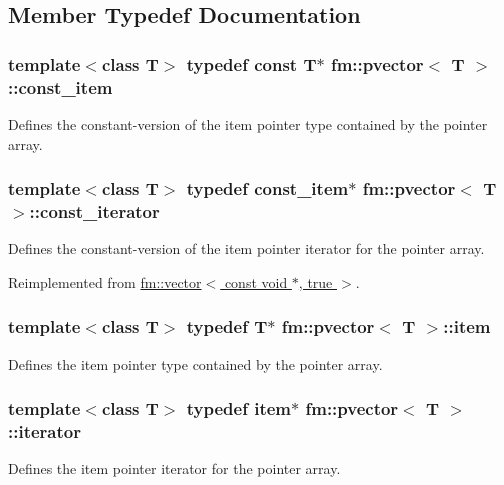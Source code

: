 \subsection{Member Typedef Documentation}
\hypertarget{classfm_1_1pvector_a6b343b4ab437d545714ff971a512bd68}{
\subsubsection[{const\_\-item}]{\setlength{\rightskip}{0pt plus 5cm}template$<$class T$>$ typedef const T$\ast$ {\bf fm::pvector}$<$ T $>$::{\bf const\_\-item}}}
\label{classfm_1_1pvector_a6b343b4ab437d545714ff971a512bd68}
Defines the constant-\/version of the item pointer type contained by the pointer array. \hypertarget{classfm_1_1pvector_a3b3854f2e635665ad6a0d59bf841099a}{
\subsubsection[{const\_\-iterator}]{\setlength{\rightskip}{0pt plus 5cm}template$<$class T$>$ typedef {\bf const\_\-item}$\ast$ {\bf fm::pvector}$<$ T $>$::{\bf const\_\-iterator}}}
\label{classfm_1_1pvector_a3b3854f2e635665ad6a0d59bf841099a}
Defines the constant-\/version of the item pointer iterator for the pointer array. 

Reimplemented from \hyperlink{classfm_1_1vector_aa012e8933574a62a4cc52e186a917722}{fm::vector$<$ const void $\ast$, true $>$}.

\hypertarget{classfm_1_1pvector_af6ced3802a18342adc0b26355d1b75bf}{
\subsubsection[{item}]{\setlength{\rightskip}{0pt plus 5cm}template$<$class T$>$ typedef T$\ast$ {\bf fm::pvector}$<$ T $>$::{\bf item}}}
\label{classfm_1_1pvector_af6ced3802a18342adc0b26355d1b75bf}
Defines the item pointer type contained by the pointer array. \hypertarget{classfm_1_1pvector_aee306ff70b8a124899a67cbe5b2fabb3}{
\subsubsection[{iterator}]{\setlength{\rightskip}{0pt plus 5cm}template$<$class T$>$ typedef {\bf item}$\ast$ {\bf fm::pvector}$<$ T $>$::{\bf iterator}}}
\label{classfm_1_1pvector_aee306ff70b8a124899a67cbe5b2fabb3}
Defines the item pointer iterator for the pointer array. 

